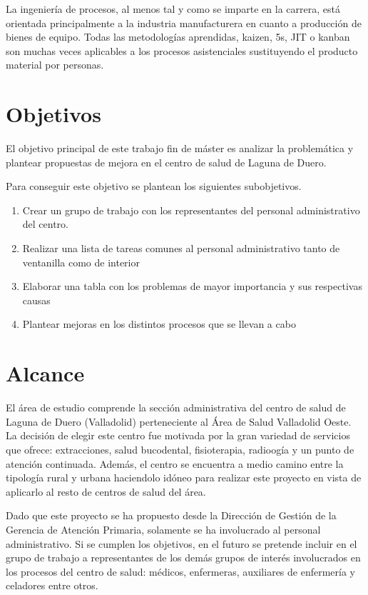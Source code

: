 La ingeniería de procesos, al menos tal y como se imparte en la carrera, está orientada principalmente a la industria manufacturera en cuanto a producción de bienes de equipo. Todas las metodologías aprendidas, kaizen, 5s, JIT o kanban son muchas veces aplicables a los procesos asistenciales sustituyendo el producto material por personas.

\section{Objetivos}

El objetivo principal de este trabajo fin de máster es analizar la problemática y plantear propuestas de mejora en el centro de salud de Laguna de Duero.

Para conseguir este objetivo se plantean los siguientes subobjetivos.
\begin{enumerate}
    \item Crear un grupo de trabajo con los representantes del personal administrativo del centro.
    \item Realizar una lista de tareas comunes al personal administrativo tanto de ventanilla como de interior
    \item Elaborar una tabla con los problemas de mayor importancia y sus respectivas causas
    \item Plantear mejoras en los distintos procesos que se llevan a cabo
\end{enumerate}

\section{Alcance}

El área de estudio comprende la sección administrativa del centro de salud de Laguna de Duero (Valladolid) perteneciente al Área de Salud Valladolid Oeste. La decisión de elegir este centro fue motivada por la gran variedad de servicios que ofrece: extracciones, salud bucodental, fisioterapia, radioogía y un punto de atención continuada. Además, el centro se encuentra a medio camino entre la tipología rural y urbana haciendolo idóneo para realizar este proyecto en vista de aplicarlo al resto de centros de salud del área.

Dado que este proyecto se ha propuesto desde la Dirección de Gestión de la Gerencia de Atención Primaria, solamente se ha involucrado al personal administrativo. Si se cumplen los objetivos, en el futuro se pretende incluir en el grupo de trabajo a representantes de los demás grupos de interés involucrados en los procesos del centro de salud: médicos, enfermeras, auxiliares de enfermería y celadores entre otros.

